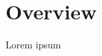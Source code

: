 \documentclass[./main.tex]{subfiles}
\begin{document}
	\chapter{Overview}
	Lorem ipsum
\end{document}
